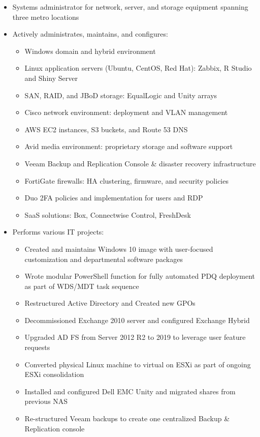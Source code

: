 \documentclass[line]{res}
\begin{document}
\begin{resume}
	\begin{itemize}
		\item Systems administrator for network, server, and storage equipment spanning three metro locations
		\item Actively administrates, maintains, and configures:
			\begin{itemize}
				\item Windows domain and hybrid environment
				\item Linux application servers (Ubuntu, CentOS, Red Hat): Zabbix, R Studio and Shiny Server
				\item SAN, RAID, and JBoD storage: EqualLogic and Unity arrays
				\item Cisco network environment: deployment and VLAN management
				\item AWS EC2 instances, S3 buckets, and Route 53 DNS			
				\item Avid media environment: proprietary storage and software support
				\item Veeam Backup and Replication Console \& disaster recovery infrastructure
				\item FortiGate firewalls: HA clustering, firmware, and security policies
				\item Duo 2FA policies and implementation for users and RDP
				\item SaaS solutions: Box, Connectwise Control, FreshDesk
			\end{itemize}
		\item Performs various IT projects:
			\begin{itemize}
				\item Created and maintains Windows 10 image with user-focused customization and departmental software packages
				\item Wrote modular PowerShell function for fully automated PDQ deployment as part of WDS/MDT task sequence
				\item Restructured Active Directory and Created new GPOs 
				\item Decommissioned Exchange 2010 server and configured Exchange Hybrid
				\item Upgraded AD FS from Server 2012 R2 to 2019 to leverage user feature requests
				\item Converted physical Linux machine to virtual on ESXi as part of ongoing ESXi consolidation
				\item Installed and configured Dell EMC Unity and migrated shares from previous NAS
				\item Re-structured Veeam backups to create one centralized Backup \& Replication console

\end{itemize}
\end{itemize}
\end{resume}
\end{document}
